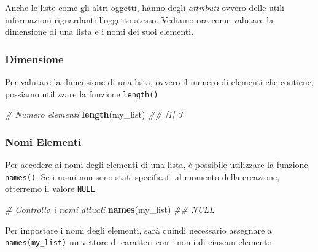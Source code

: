 \documentclass[
]{book}
\newenvironment{Shaded}{\begin{snugshade}}{\end{snugshade}}
\newcommand{\CommentTok}[1]{\textcolor[rgb]{0.56,0.35,0.01}{\textit{#1}}}
\newcommand{\KeywordTok}[1]{\textcolor[rgb]{0.13,0.29,0.53}{\textbf{#1}}}
\newcommand{\NormalTok}[1]{#1}
\newcommand{\StringTok}[1]{\textcolor[rgb]{0.31,0.60,0.02}{#1}}
\begin{document}
Anche le liste come gli altri oggetti, hanno degli \emph{attributi} ovvero delle utili informazioni riguardanti l'oggetto stesso. Vediamo ora come valutare la dimensione di una lista e i nomi dei suoi elementi.

\hypertarget{dimensione-3}{%
\subsubsection*{Dimensione}\label{dimensione-3}}

Per valutare la dimensione di una lista, ovvero il numero di elementi che contiene, possiamo utilizzare la funzione \texttt{length()}

\begin{Shaded}
\begin{Highlighting}[]
\CommentTok{# Numero elementi}
\KeywordTok{length}\NormalTok{(my_list)}
\CommentTok{## [1] 3}
\end{Highlighting}
\end{Shaded}

\hypertarget{nomi-elementi-1}{%
\subsubsection*{Nomi Elementi}\label{nomi-elementi-1}}

Per accedere ai nomi degli elementi di una lista, è possibile utilizzare la funzione \texttt{names()}. Se i nomi non sono stati specificati al momento della creazione, otterremo il valore \texttt{NULL}.

\begin{Shaded}
\begin{Highlighting}[]
\CommentTok{# Controllo i nomi attuali}
\KeywordTok{names}\NormalTok{(my_list)}
\CommentTok{## NULL}
\end{Highlighting}
\end{Shaded}

Per impostare i nomi degli elementi, sarà quindi necessario assegnare a \texttt{names(my\_list)} un vettore di caratteri con i nomi di ciascun elemento.

\begin{Shaded}
\end{Shaded}
\end{document}
